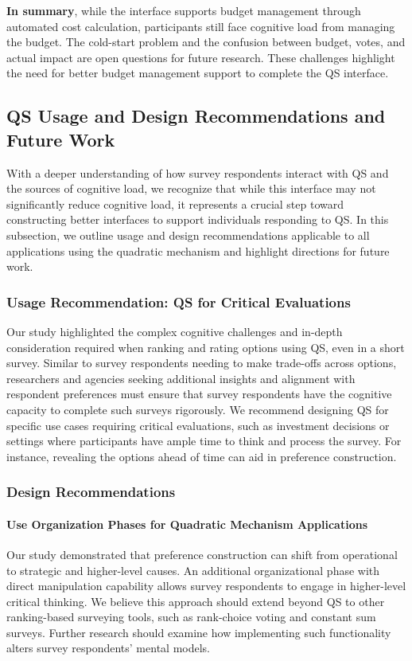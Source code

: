 \textbf{In summary}, while the interface supports budget management through automated cost calculation, participants still face cognitive load from managing the budget. The cold-start problem and the confusion between budget, votes, and actual impact are open questions for future research. These challenges highlight the need for better budget management support to complete the QS interface.

\subsection{QS Usage and Design Recommendations and Future Work}
With a deeper understanding of how survey respondents interact with QS and the sources of cognitive load, we recognize that while this interface may not significantly reduce cognitive load, it represents a crucial step toward constructing better interfaces to support individuals responding to QS. In this subsection, we outline usage and design recommendations applicable to all applications using the quadratic mechanism and highlight directions for future work.

\subsubsection{Usage Recommendation: QS for Critical Evaluations}
Our study highlighted the complex cognitive challenges and in-depth consideration required when ranking and rating options using QS, even in a short survey. Similar to survey respondents needing to make trade-offs across options, researchers and agencies seeking additional insights and alignment with respondent preferences must ensure that survey respondents have the cognitive capacity to complete such surveys rigorously. We recommend designing QS for specific use cases requiring critical evaluations, such as investment decisions or settings where participants have ample time to think and process the survey. For instance, revealing the options ahead of time can aid in preference construction.

\subsubsection{Design Recommendations}
\paragraph{Use Organization Phases for Quadratic Mechanism Applications}
Our study demonstrated that preference construction can shift from operational to strategic and higher-level causes. An additional organizational phase with direct manipulation capability allows survey respondents to engage in higher-level critical thinking. We believe this approach should extend beyond QS to other ranking-based surveying tools, such as rank-choice voting and constant sum surveys. Further research should examine how implementing such functionality alters survey respondents' mental models.

